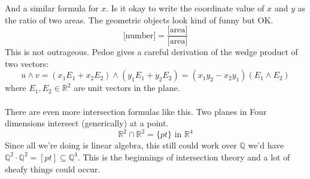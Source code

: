 \documentclass[12pt]{article}
\begin{document}
And a similar formula for $x$.  Is it okay to write the coordinate value of $x$ and $y$ as the ratio of two areas.  The geometric objects look kind of funny but OK.
$$ \text{[number]} = \frac{\text{[area]}}{\text{[area]}} $$
This is not outrageous.  Pedoe gives a careful derivation of the wedge product of two vectors:
$$ u \wedge v = (x_1 E_1 + x_2 E_2) \wedge (y_1 E_1 + y_2 E_2) = (x_1 y_2 - x_2 y_1) (E_1 \wedge E_2) $$
where $E_1, E_2 \in \mathbb{R}^2$ are unit vectors in the plane.  \\ \\
There are even more intersection formulas like this.  Two planes in Four dimensions intersect (generically) at a point. 
$$ \mathbb{R}^2 \cap \mathbb{R}^2 = \{ pt \} \text{ in } \mathbb{R}^4 $$
Since all we're doing is linear algebra, this still could work over $\mathbb{Q}$ we'd have $\mathbb{Q}^2 \cdot \mathbb{Q}^2 = [pt] \subseteq \mathbb{Q}^4$.  This is the beginnings of intersection theory and a lot of sheafy things could occur.

\newpage
\end{document}
